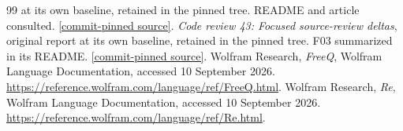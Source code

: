 \documentclass[11pt,letterpaper]{article}
\theoremstyle{remark}\newtheorem{remark}[theorem]{Remark}
\begin{document}
\begin{thebibliography}{99}
at its own baseline, retained in the pinned tree. README and article consulted.
\href{https://github.com/VladimirReshetnikov/Asymptotic/blob/efa1aeec4845a9c35e140963a0333d0c9ec33b05/external-reports/code-review/wave-6/code-review-46/README.md}{[commit-pinned source]}.
 \emph{Code review 43: Focused source-review deltas}, original report
at its own baseline, retained in the pinned tree. F03 summarized in its README.
\href{https://github.com/VladimirReshetnikov/Asymptotic/blob/efa1aeec4845a9c35e140963a0333d0c9ec33b05/external-reports/code-review/wave-5/code-review-43/README.md}{[commit-pinned source]}.
 Wolfram Research, \emph{FreeQ}, Wolfram Language Documentation,
accessed 10 September 2026.
\url{https://reference.wolfram.com/language/ref/FreeQ.html}.
 Wolfram Research, \emph{Re}, Wolfram Language Documentation,
accessed 10 September 2026.
\url{https://reference.wolfram.com/language/ref/Re.html}.
\end{thebibliography}
\end{document}
